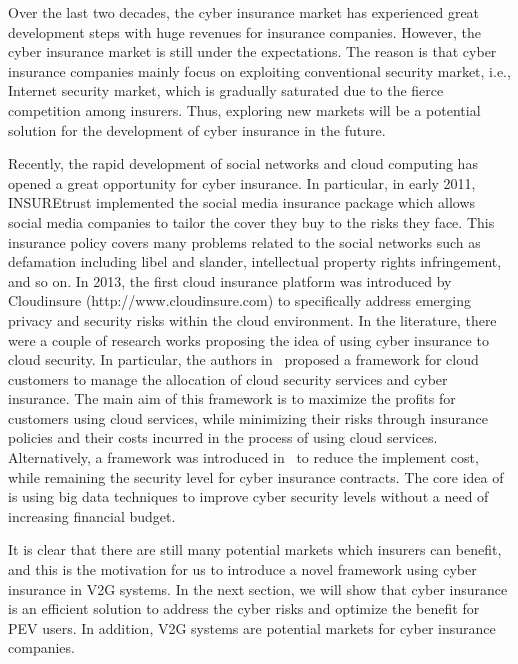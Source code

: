 \documentclass[twocolumn,10pt]{IEEEtran}
\begin{document}
Over the last two decades, the cyber insurance market has experienced great development steps with huge revenues for insurance companies. However, the cyber insurance market is still under the expectations. The reason is that cyber insurance companies mainly focus on exploiting conventional security market, i.e., Internet security market, which is gradually saturated due to the fierce competition among insurers. Thus, exploring new markets will be a potential solution for the development of cyber insurance in the future.

Recently, the rapid development of social networks and cloud computing has opened a great opportunity for cyber insurance. In particular, in early 2011, INSUREtrust  implemented the social media insurance package which allows social media companies to tailor the cover they buy to the risks they face. This insurance policy covers many problems related to the social networks such as defamation including libel and slander, intellectual property rights infringement, and so on. In 2013, the first cloud insurance platform was introduced by Cloudinsure (http://www.cloudinsure.com) to specifically address emerging privacy and security risks within the cloud environment. In the literature, there were a couple of research works proposing the idea of using cyber insurance to cloud security. In particular, the authors in~\cite{chaisiri2015} proposed a framework for cloud customers to manage the allocation of cloud security services and cyber insurance. The main aim of this framework is to maximize the profits for customers using cloud services, while minimizing their risks through insurance policies and their costs incurred in the process of using cloud services. Alternatively, a framework was introduced in~\cite{Gai2016ANovel} to reduce the implement cost, while remaining the security level for cyber insurance contracts. The core idea of~\cite{Gai2016ANovel} is using big data techniques to improve cyber security levels without a need of increasing financial budget. 

It is clear that there are still many potential markets which insurers can benefit, and this is the motivation for us to introduce a novel framework using cyber insurance in V2G systems. In the next section, we will show that cyber insurance is an efficient solution to address the cyber risks and optimize the benefit for PEV users. In addition, V2G systems are potential markets for cyber insurance companies. 


\end{document}
